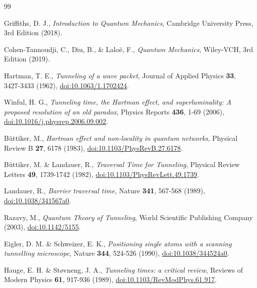 \documentclass[%
 reprint,
 amsmath,amssymb,
 aps,
]{revtex4-1}
\numberwithin{equation}{section}%
\begin{document}


\begin{thebibliography}{99}

Griffiths, D. J.,
\textit{Introduction to Quantum Mechanics},
Cambridge University Press, 3rd Edition (2018).

Cohen-Tannoudji, C., Diu, B., \& Laloë, F.,
\textit{Quantum Mechanics},
Wiley-VCH, 3rd Edition (2019).

Hartman, T. E.,
\textit{Tunneling of a wave packet},
Journal of Applied Physics \textbf{33}, 3427-3433 (1962),
\href{https://doi.org/10.1063/1.1702424}{doi:10.1063/1.1702424}.

Winful, H. G.,
\textit{Tunneling time, the Hartman effect, and superluminality: A proposed resolution of an old paradox},
Physics Reports \textbf{436}, 1-69 (2006),
\href{https://doi.org/10.1016/j.physrep.2006.09.002}{doi:10.1016/j.physrep.2006.09.002}.

Büttiker, M.,
\textit{Hartman effect and non-locality in quantum networks},
Physical Review B \textbf{27}, 6178 (1983),
\href{https://doi.org/10.1103/PhysRevB.27.6178}{doi:10.1103/PhysRevB.27.6178}.

Büttiker, M. \& Landauer, R.,
\textit{Traversal Time for Tunneling},
Physical Review Letters \textbf{49}, 1739-1742 (1982),
\href{https://doi.org/10.1103/PhysRevLett.49.1739}{doi:10.1103/PhysRevLett.49.1739}.

Landauer, R.,
\textit{Barrier traversal time},
Nature \textbf{341}, 567-568 (1989),
\href{https://doi.org/10.1038/341567a0}{doi:10.1038/341567a0}.

Razavy, M.,
\textit{Quantum Theory of Tunneling},
World Scientific Publishing Company (2003),
\href{https://doi.org/10.1142/5155}{doi:10.1142/5155}.

Eigler, D. M. \& Schweizer, E. K.,
\textit{Positioning single atoms with a scanning tunnelling microscope},
Nature \textbf{344}, 524-526 (1990),
\href{https://doi.org/10.1038/344524a0}{doi:10.1038/344524a0}.

Hauge, E. H. \& Støvneng, J. A.,
\textit{Tunneling times: a critical review},
Reviews of Modern Physics \textbf{61}, 917-936 (1989),
\href{https://doi.org/10.1103/RevModPhys.61.917}{doi:10.1103/RevModPhys.61.917}.


\end{thebibliography}
\end{document}

